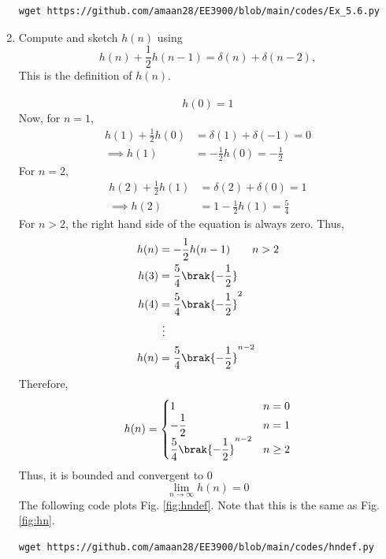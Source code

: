 \documentclass[journal,12pt,twocolumn]{IEEEtran}
\renewcommand\thesection{\arabic{section}}
\begin{document}
\begin{enumerate}[label=\thesection.\arabic*]
	\solution 
\begin{lstlisting}
wget https://github.com/amaan28/EE3900/blob/main/codes/Ex_5.6.py
\end{lstlisting}
	\item 
	Compute and sketch $h(n)$ using 
	\begin{equation}
		\label{eq:iir_filter_h}
		h(n) + \frac{1}{2}h(n-1) = \delta(n) + \delta(n-2), 
	\end{equation}
	This is the definition of $h(n)$.\\
	\\
	\solution 
	\begin{equation}
		h(0) = 1
	\end{equation}
	Now, for $n = 1$,
	\begin{align}
		h(1) + \frac12 h(0) &= \delta(1) + \delta(-1) = 0 \\
		\implies h(1) &= - \frac{1}{2} h(0) = -\frac{1}{2}
	\end{align}
	For $n = 2$,
	\begin{align}
		h(2) + \frac12 h(1) &= \delta(2) + \delta(0) = 1 \\
		\implies h(2) &= 1 - \frac{1}{2} h(1) = \frac{5}{4}
	\end{align}
	For $n > 2$, the right hand side of the equation is always zero. Thus,
	\begin{align}
		h(n) &= -\frac{1}{2} h(n-1) \qquad n > 2 \\
		h(3) &= \frac{5}{4} \brak{-\frac12} \\
		h(4) &= \frac{5}{4} \brak{-\frac12}^2 \\
		&~\vdots \\
		h(n) &= \frac{5}{4} \brak{-\frac12}^{n-2}
	\end{align}
	Therefore,
	\begin{align}
		h(n) = 
		\begin{cases}
			1 & n = 0 \\
			-\dfrac{1}{2} & n = 1 \\
			\dfrac{5}{4} \brak{-\dfrac12}^{n-2} & n \ge 2
		\end{cases}
	\end{align}
	Thus, it is bounded and convergent to $0$
	\begin{equation}
		\lim_{n \to \infty} h(n) = 0
	\end{equation} 	
	 The following code plots Fig. \ref{fig:hndef}. Note that this is the same as Fig. 
	\ref{fig:hn}. 
	\begin{lstlisting}
wget https://github.com/amaan28/EE3900/blob/main/codes/hndef.py

\end{lstlisting}
\end{enumerate}
\end{document}
